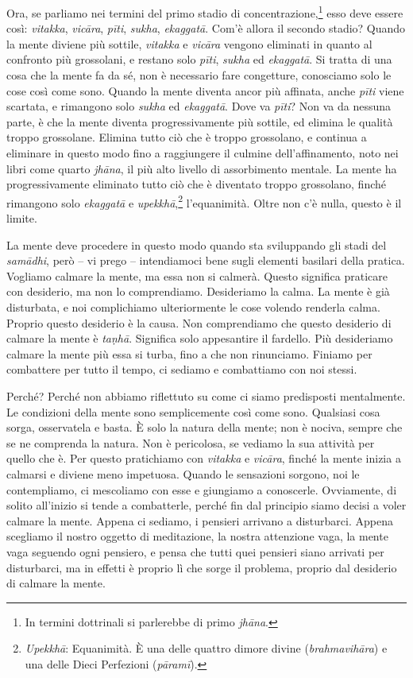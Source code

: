 Ora, se parliamo nei termini del primo stadio di
concentrazione,\footnote{In termini dottrinali si parlerebbe di primo
  \emph{jhāna}.} esso deve essere così: \emph{vitakka}, \emph{vicāra},
\emph{pīti}, \emph{sukha}, \emph{ekaggatā}. Com'è allora il secondo
stadio? Quando la mente diviene più sottile, \emph{vitakka} e
\emph{vicāra} vengono eliminati in quanto al confronto più grossolani, e
restano solo \emph{pīti}, \emph{sukha} ed \emph{ekaggatā}. Si tratta di
una cosa che la mente fa da sé, non è necessario fare congetture,
conosciamo solo le cose così come sono. Quando la mente diventa ancor
più affinata, anche \emph{pīti} viene scartata, e rimangono solo
\emph{sukha} ed \emph{ekaggatā}. Dove va \emph{pīti}? Non va da nessuna
parte, è che la mente diventa progressivamente più sottile, ed elimina
le qualità troppo grossolane. Elimina tutto ciò che è troppo grossolano,
e continua a eliminare in questo modo fino a raggiungere il culmine
dell'affinamento, noto nei libri come quarto \emph{jhāna}, il più alto
livello di assorbimento mentale. La mente ha progressivamente eliminato
tutto ciò che è diventato troppo grossolano, finché rimangono solo
\emph{ekaggatā} e \emph{upekkhā},\footnote{\emph{Upekkhā}: Equanimità. È
  una delle quattro dimore divine (\emph{brahmavihāra}) e una delle
  Dieci Perfezioni (\emph{pāramī}).} l'equanimità. Oltre non c'è nulla,
questo è il limite.

La mente deve procedere in questo modo quando sta sviluppando gli stadi
del \emph{samādhi}, però -- vi prego -- intendiamoci bene sugli elementi
basilari della pratica. Vogliamo calmare la mente, ma essa non si
calmerà. Questo significa praticare con desiderio, ma non lo
comprendiamo. Desideriamo la calma. La mente è già disturbata, e noi
complichiamo ulteriormente le cose volendo renderla calma. Proprio
questo desiderio è la causa. Non comprendiamo che questo desiderio di
calmare la mente è \emph{taṇhā}. Significa solo appesantire il fardello.
Più desideriamo calmare la mente più essa si turba, fino a che non
rinunciamo. Finiamo per combattere per tutto il tempo, ci sediamo e
combattiamo con noi stessi.

Perché? Perché non abbiamo riflettuto su come ci siamo predisposti
mentalmente. Le condizioni della mente sono semplicemente così come
sono. Qualsiasi cosa sorga, osservatela e basta. È solo la natura della
mente; non è nociva, sempre che se ne comprenda la natura. Non è
pericolosa, se vediamo la sua attività per quello che è. Per questo
pratichiamo con \emph{vitakka} e \emph{vicāra}, finché la mente inizia a
calmarsi e diviene meno impetuosa. Quando le sensazioni sorgono, noi le
contempliamo, ci mescoliamo con esse e giungiamo a conoscerle.
Ovviamente, di solito all'inizio si tende a combatterle, perché fin dal
principio siamo decisi a voler calmare la mente. Appena ci sediamo, i
pensieri arrivano a disturbarci. Appena scegliamo il nostro oggetto di
meditazione, la nostra attenzione vaga, la mente vaga seguendo ogni
pensiero, e pensa che tutti quei pensieri siano arrivati per
disturbarci, ma in effetti è proprio lì che sorge il problema, proprio
dal desiderio di calmare la mente.


